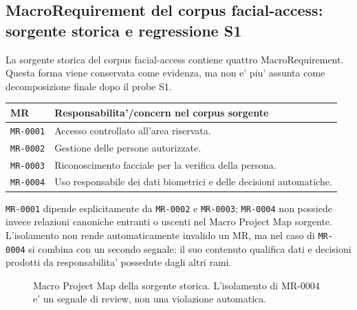 \documentclass[11pt,a4paper]{article}
\begin{document}
\subsection{MacroRequirement del corpus facial-access: sorgente storica e regressione S1}

La sorgente storica del corpus facial-access contiene quattro MacroRequirement. Questa forma viene conservata come evidenza, ma non e' piu' assunta come decomposizione finale dopo il probe S1.

\begin{longtable}{p{}p{}}
\toprule
\textbf{MR} & \textbf{Responsabilita'/concern nel corpus sorgente} \\
\midrule
\endhead
\texttt{MR-0001} & Accesso controllato all'area riservata. \\
\texttt{MR-0002} & Gestione delle persone autorizzate. \\
\texttt{MR-0003} & Riconoscimento facciale per la verifica della persona. \\
\texttt{MR-0004} & Uso responsabile dei dati biometrici e delle decisioni automatiche. \\
\bottomrule
\end{longtable}

\texttt{MR-0001} dipende esplicitamente da \texttt{MR-0002} e \texttt{MR-0003}; \texttt{MR-0004} non possiede invece relazioni canoniche entranti o uscenti nel Macro Project Map sorgente. L'isolamento non rende automaticamente invalido un MR, ma nel caso di \texttt{MR-0004} si combina con un secondo segnale: il suo contenuto qualifica dati e decisioni prodotti da responsabilita' possedute dagli altri rami.

\begin{figure}[h]
\centering
{}
\caption{Macro Project Map della sorgente storica. L'isolamento di MR-0004 e' un segnale di review, non una violazione automatica.}
\end{figure}
\end{document}
